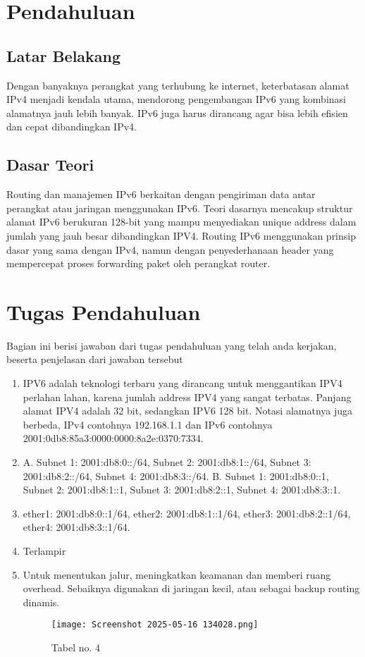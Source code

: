 \section{Pendahuluan}
\subsection{Latar Belakang}
Dengan banyaknya perangkat yang terhubung ke internet, keterbatasan alamat IPv4 menjadi kendala utama, mendorong pengembangan IPv6 yang kombinasi alamatnya jauh lebih banyak. IPv6 juga harus dirancang agar bisa lebih efisien dan cepat dibandingkan IPv4.

\subsection{Dasar Teori}
Routing dan manajemen IPv6 berkaitan dengan pengiriman data antar perangkat atau jaringan menggunakan IPv6. Teori dasarnya mencakup struktur alamat IPv6 berukuran 128-bit yang mampu menyediakan unique address dalam jumlah yang jauh besar dibandingkan IPV4. Routing IPv6 menggunakan prinsip dasar yang sama dengan IPv4, namun dengan penyederhanaan header yang mempercepat proses forwarding paket oleh perangkat router.

\section{Tugas Pendahuluan}
Bagian ini berisi jawaban dari tugas pendahuluan yang telah anda kerjakan, beserta penjelasan dari jawaban tersebut
\begin{enumerate}
	\item IPV6 adalah teknologi terbaru yang dirancang untuk menggantikan IPV4 perlahan lahan, karena jumlah address IPV4 yang sangat terbatas. Panjang alamat IPV4 adalah 32 bit, sedangkan IPV6 128 bit. Notasi alamatnya juga berbeda, IPv4 contohnya 192.168.1.1 dan IPv6 contohnya 2001:0db8:85a3:0000:0000:8a2e:0370:7334. 
	\item A. Subnet 1: 2001:db8:0::/64, Subnet 2: 2001:db8:1::/64, Subnet 3: 2001:db8:2::/64, Subnet 4: 2001:db8:3::/64. B. Subnet 1: 2001:db8:0::1, Subnet 2: 2001:db8:1::1, Subnet 3: 2001:db8:2::1, Subnet 4: 2001:db8:3::1.
	\item ether1: 2001:db8:0::1/64, ether2: 2001:db8:1::1/64, ether3: 2001:db8:2::1/64, ether4: 2001:db8:3::1/64.
        \item Terlampir
        \item Untuk menentukan jalur, meningkatkan keamanan dan memberi ruang overhead. Sebaiknya digunakan di jaringan kecil, atau sebagai backup routing dinamis.

\begin{figure}
    \centering
    \texttt{[image: Screenshot 2025-05-16 134028.png]}
    \caption{Tabel no. 4}
    \label{fig:enter-label}
\end{figure}

\end{enumerate}
